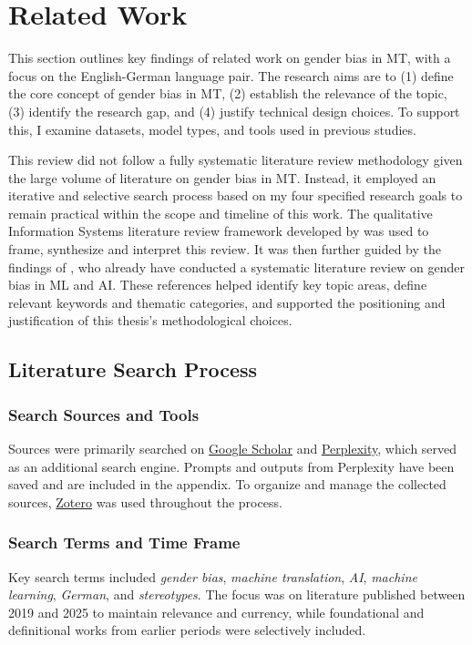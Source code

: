 \chapter{Related Work}

This section outlines key findings of related work on gender bias in MT, with a focus on the English-German language pair. The research aims are to (1) define the core concept of gender bias in MT, (2) establish the relevance of the topic, (3) identify the research gap, and (4) justify technical design choices. To support this, I examine datasets, model types, and tools used in previous studies.

This review did not follow a fully systematic literature review methodology given the large volume of literature on gender bias in MT. Instead, it employed an iterative and selective search process based on my four specified research goals to remain practical within the scope and timeline of this work. The qualitative Information Systems literature review framework developed by \citet{schryenWritingQualitativeLiterature2015} was used to frame, synthesize and interpret this review. It was then further guided by the findings of \citet{shresthaExploringGenderBiases2022}, who already have conducted a systematic literature review on gender bias in ML and AI. These references helped identify key topic areas, define relevant keywords and thematic categories, and supported the positioning and justification of this thesis’s methodological choices.

\section{Literature Search Process}

\subsection{Search Sources and Tools}
Sources were primarily searched on \href{https://scholar.google.com/}{Google Scholar} and \href{https://www.perplexity.ai/}{Perplexity}, which served as an additional search engine. Prompts and outputs from Perplexity have been saved and are included in the appendix. To organize and manage the collected sources, \href{https://www.zotero.org/}{Zotero} was used throughout the process.

\subsection{Search Terms and Time Frame}
Key search terms included \textit{gender bias}, \textit{machine translation}, \textit{AI}, \textit{machine learning}, \textit{German}, and \textit{stereotypes}. The focus was on literature published between 2019 and 2025 to maintain relevance and currency, while foundational and definitional works from earlier periods were selectively included.

